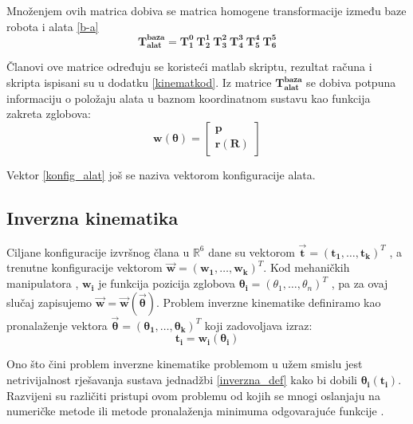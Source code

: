 \documentclass[times, utf8, diplomski, numeric]{fer}
\begin{document}
Množenjem ovih matrica dobiva se matrica homogene transformacije između baze robota i alata \ref{b-a}
\begin{equation}
\mathbf{T_{alat}^{baza}} = \mathbf{T_1^0}\ \mathbf{T_2^1}\ \mathbf{T_3^2}\ \mathbf{T_4^3}\ \mathbf{T_5^4}\ \mathbf{T_6^5}
\label{b-a}
\end{equation}

Članovi ove matrice određuju se koristeći matlab skriptu, rezultat računa i skripta ispisani su u dodatku \ref{kinematkod}.
Iz matrice $\mathbf{T_{alat}^{baza}}$  se dobiva potpuna informaciju o položaju alata u baznom koordinatnom sustavu kao funkcija zakreta zglobova:
\begin{equation}
\mathbf{w}(\bm \theta) = 
\begin{bmatrix}
\mathbf{p}\\
\mathbf{r}(\mathbf{R})
\end{bmatrix}
\label{konfig_alat}
\end{equation}

Vektor \ref{konfig_alat} još se naziva vektorom konfiguracije alata.

\subsection{Inverzna kinematika}
Ciljane konfiguracije izvršnog člana u $\mathbb{R}^{6}$ dane su vektorom $\vec{\mathbf{t}} = (\mathbf{t_1}, \ldots , \mathbf{t_k})^{T}$ , a trenutne konfiguracije vektorom
$\vec{\mathbf{w}} = (\mathbf{w_1}, \ldots , \mathbf{w_k})^{T}$. Kod mehaničkih manipulatora , $\mathbf{w_i}$ je funkcija pozicija zglobova ${\bm{\theta_i}} = (\theta_{1}, \ldots , \theta_{n})^{T}$ , pa za ovaj slučaj zapisujemo $\vec{\mathbf{w}}=\vec{\mathbf{w}}\left({\vec{\bm{\theta}}}\right) $.
Problem inverzne kinematike definiramo kao pronalaženje vektora $\vec{\bm{\theta}} = (\bm{\theta_1}, \ldots ,\bm{\theta_k})^T$ koji zadovoljava izraz:
\begin{equation}
\mathbf{t_i} = \mathbf{w_i}(\bm{\theta}_{\mathbf{i}})
\label{inverzna_def}
\end{equation}

Ono što čini problem inverzne kinematike problemom u užem smislu jest netrivijalnost rješavanja sustava jednadžbi \ref{inverzna_def} kako bi dobili $\bm{\theta}_{\mathbf{i}}(\mathbf{t_i})$. 
Razvijeni su različiti pristupi ovom problemu od kojih se mnogi oslanjaju na numeričke metode ili metode pronalaženja minimuma odgovarajuće funkcije \cite{wang1991combined}.
\end{document}
